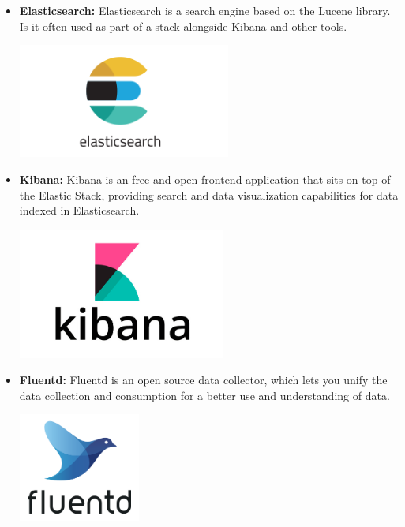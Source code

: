 \begin{itemize}
          \newpage
    \item \textbf{Elasticsearch:} \newline Elasticsearch is a search engine based on the Lucene library. Is it often used as part of a stack alongside Kibana and other tools. \newline
          \begin{minipage}{\linewidth}
              \centering
              \includegraphics[width=7cm]{src/assets/logos/elasticsearch-logo.png}
          \end{minipage}
    \item \textbf{Kibana:} \newline \cite{kibana} Kibana is an free and open frontend application that sits on top of the Elastic Stack, providing search and data visualization capabilities for data indexed in Elasticsearch. \newline
          \begin{minipage}{\linewidth}
              \centering
              \includegraphics[width=6.8cm]{src/assets/logos/kibana-logo.jpg}
          \end{minipage}
    \item \textbf{Fluentd:} \newline \cite{fluentd} Fluentd is an open source data collector, which lets you unify the data collection and consumption for a better use and understanding of data. \newline
          \begin{minipage}{\linewidth}
              \centering
              \includegraphics[width=4cm]{src/assets/logos/fluentd-logo.png}
          \end{minipage}


\end{itemize}
